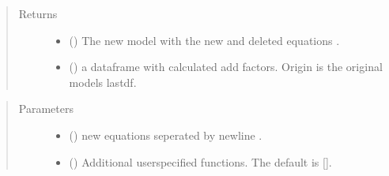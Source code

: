 \documentclass[letterpaper,10pt,english]{sphinxmanual}
\begin{document}
\begin{fulllineitems}
\begin{fulllineitems}
\begin{quote}
\begin{description}
\item[{Returns}] \leavevmode
\sphinxAtStartPar
\begin{itemize}
\item {} 
\sphinxAtStartPar
{} () \textendash{} The new  model with the new and deleted equations .

\item {} 
\sphinxAtStartPar
{} () \textendash{} a dataframe with calculated add factors. Origin is the original models lastdf.

\end{itemize}


\end{description}\end{quote}

\end{fulllineitems}


\begin{fulllineitems}
\label{\detokenize{core/modelclass:modelclass.Modify_Mixin.equpdate_old}}
\pysigstartsignatures
{}
\pysigstopsignatures\begin{quote}\begin{description}
\item[{Parameters}] \leavevmode\begin{itemize}
\item {} 
\sphinxAtStartPar
{} () \textendash{} new equations seperated by newline .

\item {} 
\sphinxAtStartPar
{} (\sphinxstyleliteralemphasis{\sphinxupquote{, }}) \textendash{} Additional userspecified functions. The default is {[}{]}.


\end{itemize}
\end{description}
\end{quote}
\end{fulllineitems}
\end{fulllineitems}
\end{document}
